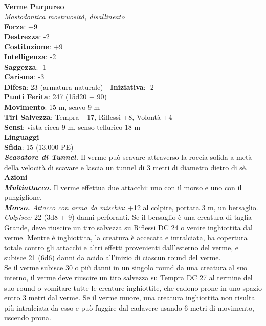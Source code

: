 \begin{multicols}{2}
\medskip\textbf{Verme Purpureo}\\
\emph{Mastodontica mostruosità, disallineato}\\
\textbf{Forza}: +9\\
\textbf{Destrezza}: -2\\
\textbf{Costituzione}: +9\\
\textbf{Intelligenza}: -2\\
\textbf{Saggezza}: -1\\
\textbf{Carisma}: -3\\
\textbf{Difesa}: 23 (armatura naturale) - \textbf{Iniziativa}: -2\\
\textbf{Punti Ferita}: 247 (15d20 + 90)\\
\textbf{Movimento}: 15 m, scavo 9 m\\
\textbf{Tiri Salvezza}: Tempra +17, Riflessi +8, Volontà +4\\
\textbf{Sensi}: vista cieca 9 m, senso tellurico 18 m\\
\textbf{Linguaggi} -\\
\textbf{Sfida}: 15 (13.000 PE)\smallskip\\
\emph{\textbf{Scavatore di Tunnel.}} Il verme può scavare attraverso la roccia solida a metà della velocità di scavare e lascia un tunnel di 3 metri di diametro dietro di sè.\\
\smallskip\textbf{Azioni}\\
\emph{\textbf{Multiattacco.}} Il verme effettua due attacchi: uno con il morso e uno con il pungiglione.\\
\emph{\textbf{Morso.} Attacco con arma da mischia}: +12 al colpire, portata 3 m, un bersaglio.\\
\emph{Colpisce:} 22 (3d8 + 9) danni perforanti. Se il bersaglio è una creatura di taglia Grande, deve riuscire un tiro salvezza su Riflessi DC  24 o venire inghiottita dal verme. Mentre è inghiottita, la creatura è accecata e intralciata, ha copertura totale contro gli attacchi e altri effetti provenienti dall'esterno del verme, e subisce 21 (6d6) danni da acido all'inizio di ciascun round del verme.\\
Se il verme subisce 30 o più danni in un singolo round da una creatura al suo interno, il verme deve riuscire un tiro salvezza su Tempra DC  27 al termine del suo round o vomitare tutte le creature inghiottite, che cadono prone in uno spazio entro 3 metri dal verme. Se il verme muore, una creatura inghiottita non risulta più intralciata da esso e può fuggire dal cadavere usando 6 metri di movimento, uscendo prona.\\


\end{multicols}
